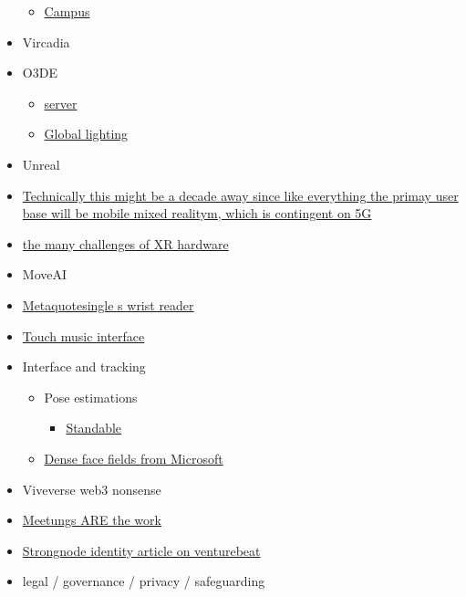 \begin{itemize}
  \begin{itemize}
   
  \item
    \href{https://techcrunch-com.cdn.ampproject.org/c/s/techcrunch.com/2022/09/09/roblox-rdc-2022/amp/}{Campus}
  \end{itemize}
\item
  Vircadia
\item
  O3DE

  \begin{itemize}
   
  \item
    \href{https://www.reddit.com/r/O3DE/comments/pbovl9/can_i_develop_my_own_dedicated_server_with_o3de/}{server}
  \item
    \href{https://www.co3dex.com/blog/image-based-lighting-1/\#/}{Global
    lighting}
  \end{itemize}
\item
  Unreal
\item
  \href{https://www.matthewball.vc/all/forwardtothemetaverseprimer}{Technically
  this might be a decade away since like everything the primay user base
  will be mobile mixed realitym, which is contingent on 5G}
\item
  \href{https://www.matthewball.vc/all/why-vrar-gets-farther-away-as-it-comes-into-focus}{the
  many challenges of XR hardware}
\item
  MoveAI
\item
  \href{https://www.from-the-interface.com/wrist-interfaces/}{Metaquotesingle s
  wrist reader}
\item
  \href{https://scitechdaily.com/groundbreaking-new-technology-allows-people-to-listen-to-music-through-touch/}{Touch
  music interface}
\item
  Interface and tracking

  \begin{itemize}
   
  \item
    Pose estimations

    \begin{itemize}
     
    \item
      \href{https://www.standablevr.com/}{Standable}
    \end{itemize}
  \item
    \href{https://microsoft.github.io/DenseLandmarks/}{Dense face fields
    from Microsoft}
  \end{itemize}
\item
  Viveverse web3 nonsense
\item
  \href{https://medium.com/@ElizAyer/meetings-are-the-work-9e429dde6aa3}{Meetungs
  ARE the work}
\item
  \href{https://venturebeat.com/virtual/identity-in-the-metaverse-creating-a-global-identity-system/}{Strongnode
  identity article on venturebeat}
\item
  legal / governance / privacy / safeguarding


\end{itemize}
